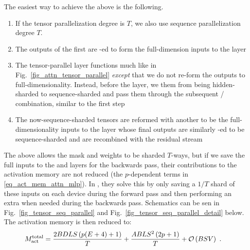 \documentclass[11pt]{article}
\begin{document}
The easiest way to achieve the above is the following.
\begin{enumerate}
	\item If the tensor parallelization degree is $ T $, we also use sequence parallelization degree $ T
	      $.
	\item The outputs of the first  are -ed to form the full-dimension
	      inputs to the   layer
	\item The tensor-parallel  layer functions much like in
	      Fig.~\ref{fig_attn_tensor_parallel} \textit{except} that we do not re-form the outputs to
	      full-dimensionality.  Instead, before the  layer, we  them
	      from being hidden-sharded to sequence-sharded and pass them through the subsequent
	      / combination, similar to the first step
	\item The now-sequence-sharded tensors are reformed with another  to be the full-dimensionality inputs to the
	       layer whose final outputs are similarly -ed to be
	      sequence-sharded and are recombined with the residual stream
\end{enumerate}
The above allows the  mask and  weights to be sharded $ T
$-ways, but if we save the full inputs to the  and   layers
for the backwards pass, their contributions to the activation memory are not reduced (the $ p
$-dependent terms in \eqref{eq_act_mem_attn_mlp}). In \cite{korthikanti2022reducing}, they solve
this by only saving a $ 1/T $ shard of these inputs on each device during the forward pass and then
performing an extra  when needed during the backwards pass. Schematics can be
sen in Fig.~\ref{fig_tensor_seq_parallel} and Fig.~\ref{fig_tensor_seq_parallel_detail} below. The
activation memory is then reduced to:
\begin{align}
	M _{ {\rm act}  } ^{ {\rm  total}  } & =\frac{ 2BDLS   \left ( p(E+4) + 1   \right ) }{ T }
	+ \frac{ ABLS ^{ 2 } \left ( 2p+1\right ) }{ T }  + \mathcal{O} \left( BSV \right) \label{eq_act_mem_total_seq_parallel}\ .
\end{align}
\end{document}
